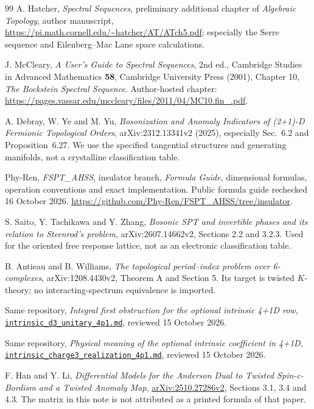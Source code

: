 \begin{thebibliography}{99}
 A. Hatcher, \emph{Spectral Sequences}, preliminary additional chapter of \emph{Algebraic Topology}, author manuscript, \url{https://pi.math.cornell.edu/~hatcher/AT/ATch5.pdf}; especially the Serre sequence and Eilenberg--Mac Lane space calculations.

 J. McCleary, \emph{A User's Guide to Spectral Sequences}, 2nd ed., Cambridge Studies in Advanced Mathematics \textbf{58}, Cambridge University Press (2001), Chapter 10, \emph{The Bockstein Spectral Sequence}. Author-hosted chapter: \url{https://pages.vassar.edu/mccleary/files/2011/04/MC10.fin_.pdf}.

 A. Debray, W. Ye and M. Yu, \emph{Bosonization and Anomaly Indicators of (2+1)-D Fermionic Topological Orders}, arXiv:2312.13341v2 (2025), especially Sec.~6.2 and Proposition~6.27. We use the specified tangential structures and generating manifolds, not a crystalline classification table.

 Phy-Ren, \emph{FSPT\_AHSS}, insulator branch, \emph{Formula Guide}, dimensional formulas, operation conventions and exact implementation. Public formula guide rechecked 16 October 2026. \url{https://github.com/Phy-Ren/FSPT_AHSS/tree/insulator}.

 S. Saito, Y. Tachikawa and Y. Zhang, \emph{Bosonic SPT and invertible phases and its relation to Steenrod's problem}, arXiv:2607.14662v2, Sections 2.2 and 3.2.3. Used for the oriented free response lattice, not as an electronic classification table.

 B. Antieau and B. Williams, \emph{The topological period--index problem over 6-complexes}, arXiv:1208.4430v2, Theorem A and Section 5. Its target is twisted $K$-theory; no interacting-spectrum equivalence is imported.

 Same repository, \emph{Integral first obstruction for the optional intrinsic 4+1D row},
\href{https://github.com/Phy-Ren/FSPT_AHSS/blob/insulator/docs/e8/research/parity_bridge/intrinsic_d3_unitary_4p1.md}{\texttt{intrinsic\_d3\_unitary\_4p1.md}}, reviewed 15 October 2026.

 Same repository, \emph{Physical meaning of the optional intrinsic coefficient in 4+1D},
\href{https://github.com/Phy-Ren/FSPT_AHSS/blob/insulator/docs/e8/research/parity_bridge/intrinsic_charge3_realization_4p1.md}{\texttt{intrinsic\_charge3\_realization\_4p1.md}}, reviewed 15 October 2026.

 F. Han and Y. Li,
\emph{Differential Models for the Anderson Dual to Twisted Spin-c-Bordism and a Twisted Anomaly Map},
\href{https://arxiv.org/abs/2510.27286v2}{arXiv:2510.27286v2},
Sections 3.1, 3.4 and 4.3. The matrix in this note is not attributed as a printed
formula of that paper.


\end{thebibliography}
